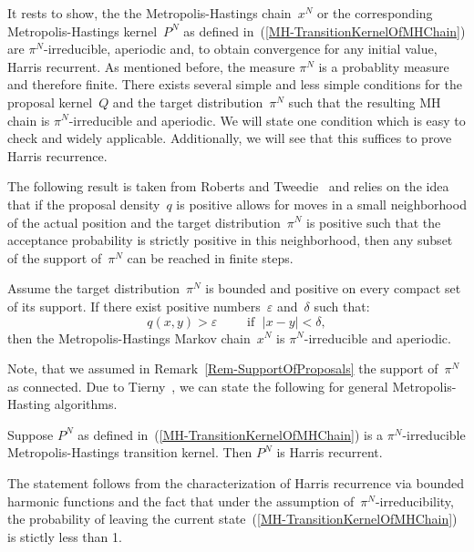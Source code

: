 It rests to show, the the Metropolis-Hastings chain~$x^N$ or the corresponding Metropolis-Hastings kernel~$P^{N}$ as defined in~(\ref{MH-TransitionKernelOfMHChain}) are $\pi^{N}$-irreducible, aperiodic and, to obtain convergence for any initial value, Harris recurrent. As mentioned before, the measure $\pi^{N}$ is a probablity measure and therefore finite. There exists several simple and less simple conditions for the proposal kernel~$Q$ and the target distribution~$\pi^{N}$ such that the resulting MH chain is $\pi^{N}$-irreducible and aperiodic. We will state one condition which is easy to check and widely applicable. Additionally, we will see that this suffices to prove Harris recurrence.

The following result is taken from Roberts and Tweedie~\autocite{RobertsTweedie1996} and relies on the idea that if the proposal density~$q$ is positive allows for moves in a small neighborhood of the actual position and the target distribution~$\pi^{N}$ is positive such that the acceptance probability is strictly positive in this neighborhood, then any subset of the support of~$\pi^{N}$ can be reached in finite steps.

\begin{lemma}
  Assume the target distribution~$\pi^{N}$ is bounded and positive on every compact set of its support. If there exist positive numbers~$\varepsilon$ and~$\delta$ such that:
  \begin{equation}
   \label{MH - Conditions for irrducibility}
   q(x, y) > \varepsilon \qquad \text{ if } \; |x-y| < \delta,
  \end{equation}
  then the Metropolis-Hastings Markov chain~$x^{N}$ is $\pi^{N}$-irreducible and aperiodic.

\end{lemma}

Note, that we assumed in Remark~\ref{Rem-SupportOfProposals} the support of~$\pi^{N}$ as connected. Due to Tierny~\autocite{Tierny1994}, we can state the following for general Metropolis-Hasting algorithms.

\begin{lemma}
 \label{MH - Harris recurrence for MH algorithms}
 Suppose $P^{N}$ as defined in~(\ref{MH-TransitionKernelOfMHChain}) is a $\pi^N$-irreducible Metropolis-Hastings transition kernel. Then $P^{N}$ is Harris recurrent.
\end{lemma}

The statement follows from the characterization of Harris recurrence via bounded harmonic functions and the fact that under the assumption of~$\pi^{N}$-irreducibility, the probability of leaving the current state~(\ref{MH-TransitionKernelOfMHChain}) is stictly less than 1.


